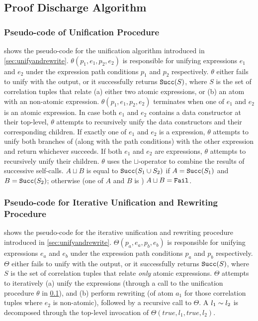 \subsection{Proof Discharge Algorithm}
\label{sec:proofalgo}

\subsubsection{Pseudo-code of Unification Procedure}
\label{sec:unifalgo}
 shows the pseudo-code for the unification algorithm introduced in \cref{sec:unifyandrewrite}.
$\theta(p_1,e_1,p_2,e_2)$ is responsible for unifying expressions $e_1$ and $e_2$ under the expression path
conditions $p_1$ and $p_2$ respectively.
$\theta$ either fails to unify with the  output, or it successfully returns ${\tt Succ}(S)$, where $S$
is the set of correlation tuples that relate (a) either two atomic expressions, or (b) an atom with an non-atomic expression.
$\theta(p_1,e_1,p_2,e_2)$ terminates when one of $e_1$ and $e_2$ is an atomic expression.
In case both $e_1$ and $e_2$ contains a data constructor at their top-level, $\theta$ attempts to recursively unify the data constructors and their corresponding children.
If exactly one of $e_1$ and $e_2$ is a \sumDtor{} expression, $\theta$ attempts to unify both branches of \sumDtor{} (along with the path conditions) with the other expression
and return whichever succeeds.
If both $e_1$ and $e_2$ are \sumDtor{} expressions, $\theta$ attempts to recursively unify their children.
$\theta$ uses the $\sqcup$-operator to combine the results of successive self-calls.
$A \sqcup B$ is equal to ${\tt Succ}(S_1 \cup S_2)$ if $A = {\tt Succ}(S_1)$ and $B = {\tt Succ}(S_2)$;
otherwise (one of $A$ and $B$ is ) $A \sqcup B = {\tt Fail}$.



\subsubsection{Pseudo-code for Iterative Unification and Rewriting Procedure}
\label{sec:unifyandrewritealgo}
 shows the pseudo-code for the iterative unification and rewriting procedure
introduced in \cref{sec:unifyandrewrite}.
$\Theta(p_a,e_a,p_b,e_b)$ is responsible for unifying expressions $e_a$ and $e_b$ under the expression
path conditions $p_a$ and $p_b$ respectively.
$\Theta$ either fails to unify with the  output, or it successfully returns ${\tt Succ}(S)$, where $S$
is the set of correlation tuples that relate {\em only} atomic expressions.
$\Theta$ attempts to iteratively (a) unify the expressions (through a call to the unification procedure $\theta$ in \cref{sec:proofalgo}),
and (b) perform rewriting (of atom $a_1$ for those correlation tuples  where $e_2$ is non-atomic), followed by
a recursive call to $\Theta$.
A \recursiveRelation{} $l_1 \sim{} l_2$ is decomposed through the top-level invocation of $\Theta(true,l_1,true,l_2)$.

